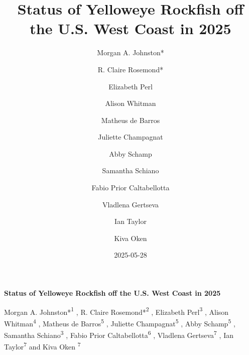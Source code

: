 \documentclass[
]{scrartcl}
\title{Status of Yelloweye Rockfish off the U.S. West Coast in 2025}
\author{Morgan A. Johnston* \and R. Claire Rosemond* \and Elizabeth
Perl \and Alison Whitman \and Matheus de Barros \and Juliette
Champagnat \and Abby Schamp \and Samantha Schiano \and Fabio Prior
Caltabellotta \and Vladlena Gertseva \and Ian Taylor \and Kiva Oken}
\date{2025-05-28}
\begin{document}
  \begin{titlepage}

  \begin{minipage}[b][\textheight][s]{\textwidth}


  \raggedright




  {\huge\bfseries\nohyphens{Status of Yelloweye Rockfish off the U.S.
  West Coast in 2025}}\\[1\baselineskip]



  \vspace{1\baselineskip}


  \vspace{1\baselineskip}

   {\large{Morgan A. Johnston*}}{\textsuperscript{1}}%
  ,
   {\large{R. Claire Rosemond*}}{\textsuperscript{2}}%
  ,
   {\large{Elizabeth Perl}}{\textsuperscript{3}}%
  ,
   {\large{Alison Whitman}}{\textsuperscript{4}}%
  ,
   {\large{Matheus de Barros}}{\textsuperscript{5}}%
  ,
   {\large{Juliette Champagnat}}{\textsuperscript{5}}%
  ,
   {\large{Abby Schamp}}{\textsuperscript{5}}%
  ,
   {\large{Samantha Schiano}}{\textsuperscript{3}}%
  ,
   {\large{Fabio Prior Caltabellotta}}{\textsuperscript{6}}%
  ,
   {\large{Vladlena Gertseva}}{\textsuperscript{7}}%
  ,
   {\large{Ian Taylor}}{\textsuperscript{7}}%
  { and \large{Kiva Oken}}%
  {\textsuperscript{7}}%



\end{minipage}
\end{titlepage}
\end{document}
